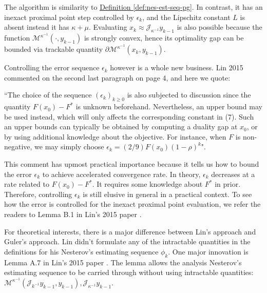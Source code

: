 \documentclass[12pt]{article}
\begin{document}
    \begin{remark}
        The algorithm is similarity to
        \hyperref[def:nes-est-seq-pg]{Definition \ref*{def:nes-est-seq-pg}}. 
        In contrast, it has an inexact proximal point step controlled by $\epsilon_k$, and the Lipschitz constant $L$ is absent instead it has $\kappa + \mu$. 
        Evaluating $x_k \approx \mathcal J_{\kappa^{-1}}y_{k - 1}$ is also possible because the function $\mathcal M^{\kappa^{-1}}(\cdot, y_{k - 1})$ is strongly convex, hence its optimality gap can be bounded via trackable quantity $\partial \mathcal M^{\kappa^{-1}}(x_k, y_{k - 1})$. 

        Controlling the error sequence $\epsilon_k$ however is a whole new business. 
        Lin 2015 \cite{lin_universal_2015} commented on the second last paragraph on page 4, and here we quote:
        \par
        ``The choice of the sequence $(\epsilon_k)_{k \ge 0}$ is also subjected to discussion since the quantity $F(x_0) - F^*$ is unknown beforehand. Nevertheless, an upper bound may be used instead, which will only affects the corresponding constant in (7). Such an upper bounds can typically be obtained by computing a duality gap at $x_0$, or by using additional knowledge about the objective. For instance, when $F$ is non-negative, we may simply choose $\epsilon_k = (2/9)F(x_0)(1 - \rho)^k$". 
        
        This comment has upmost practical importance because it tells us how to bound the error $\epsilon_k$ to achieve accelerated convergence rate. 
        In theory, $\epsilon_k$ decreases at a rate related to $F(x_0) - F^*$. 
        It requires some knowledge about $F^*$ in prior. 
        Therefore, controlling $\epsilon_k$ is still elusive in general in a practical context. 
        To see how the error is controlled for the inexact proximal point evaluation, we refer the readers to Lemma B.1 in Lin's 2015 paper \cite{lin_universal_2015}. 
    \end{remark}

    For theoretical interests, there is a major difference between Lin's approach and Guler's approach. 
    Lin didn't formulate any of the intractable quantities in the definitions for his Nesterov's estimating sequence $\phi_k$. 
    One major innovation is Lemma A.7 in Lin's 2015 paper \cite{lin_universal_2015}. 
    The lemma allows the analysis Nesterov's estimating sequence to be carried through without using intractable quantities: $\mathcal M^{\kappa^{-1}}(\mathcal J_{k^{-1}}y_{k - 1}, y_{k - 1}), \mathcal J_{\kappa^{-1}}y_{k - 1}$. 
\end{document}
